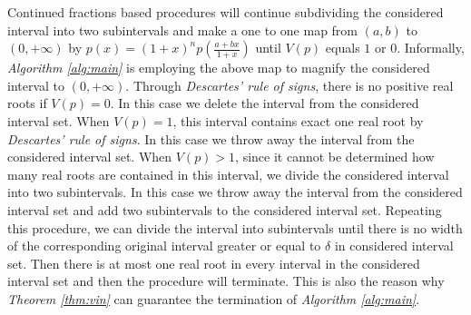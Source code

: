 Continued fractions based procedures will continue subdividing the considered interval into two subintervals and make a one to one map from $(a,b)$ to $(0,+\infty)$ by $  p(x) = (1+x)^{n}p(\frac{a+bx}{1+x})$ until $V(p)$ equals $1$ or $0$. Informally, {\em Algorithm \ref{alg:main}} is employing the above map to magnify the considered interval  to $(0,+\infty)$.  Through {\em Descartes' rule of signs}, there is no positive real roots if  $V(p)=0$. In this case we delete the interval from the considered interval set.   When $V(p)=1$, this interval contains exact one real root by {\em Descartes' rule of signs}. In this case we throw away the interval from the considered interval set. When $V(p)>1$, since it cannot be determined how many real roots are contained in this interval, we divide the considered interval into two subintervals. In this case we throw away the interval from the considered interval set and add two subintervals to the considered interval set. Repeating this procedure, we can divide the interval into  subintervals until  there is no width of  the corresponding original interval greater or equal to $\delta$ in considered interval set.   Then there is at most one real root in every interval in the considered interval set and then the procedure will terminate. This is also
the reason why {\em Theorem \ref{thm:vin}}  can guarantee the termination of {\em Algorithm \ref{alg:main}}.



